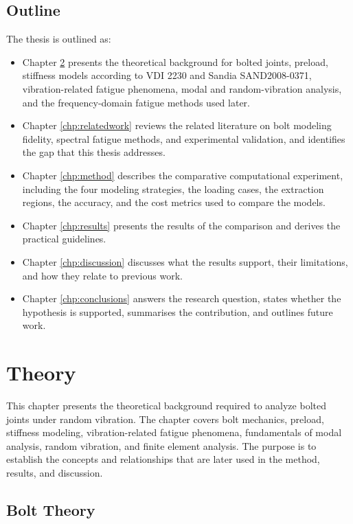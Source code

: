 \documentclass[a4paper,twoside]{bth}
\begin{document}
\section{Outline}
The thesis is outlined as:
\begin{itemize}
    \item Chapter \ref{chp:theory} presents the theoretical background for bolted joints, preload, stiffness models according to VDI 2230 and Sandia SAND2008-0371, vibration-related fatigue phenomena, modal and random-vibration analysis, and the frequency-domain fatigue methods used later.
    \item Chapter \ref{chp:relatedwork} reviews the related literature on bolt modeling fidelity, spectral fatigue methods, and experimental validation, and identifies the gap that this thesis addresses.
    \item Chapter \ref{chp:method} describes the comparative computational experiment, including the four modeling strategies, the loading cases, the extraction regions, the accuracy, and the cost metrics used to compare the models.
    \item Chapter \ref{chp:results} presents the results of the comparison and derives the practical guidelines.
    \item Chapter \ref{chp:discussion} discusses what the results support, their limitations, and how they relate to previous work.
    \item Chapter \ref{chp:conclusions} answers the research question, states whether the hypothesis is supported, summarises the contribution, and outlines future work.
\end{itemize}

\chapter{Theory} \label{chp:theory}
This chapter presents the theoretical background required to analyze bolted joints under random vibration. The chapter covers bolt mechanics, preload, stiffness modeling, vibration-related fatigue phenomena, fundamentals of modal analysis, random vibration, and finite element analysis. The purpose is to establish the concepts and relationships that are later used in the method, results, and discussion.


\section{Bolt Theory}
\end{document}

